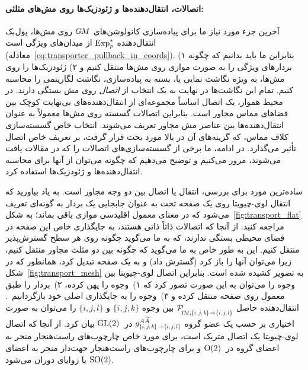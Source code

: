 \paragraph{اتصالات، انتقال‌دهنده‌ها و ژئودزیک‌ها روی مش‌های مثلثی:}
آخرین جزء مورد نیاز ما برای پیاده‌سازی کانولوشن‌های $G\mkern-1.4muM$ روی مش‌ها، پول‌بک انتقال‌دهنده $\operatorname{Exp}^*_p$ از میدان‌های ویژگی است (معادله~\eqref{eq:transporter_pullback_in_coords}).
بنابراین ما باید بدانیم که چگونه
۱) بردارهای ویژگی را به صورت موازی روی مش‌ها منتقل کنیم و
۲) ژئودزیک‌ها را روی مش‌ها، به ویژه نگاشت نمایی یا، بسته به پیاده‌سازی، نگاشت لگاریتمی را محاسبه کنیم.
تمام این نگاشت‌ها در نهایت به یک انتخاب از \emph{اتصال} روی مش بستگی دارند.
در محیط هموار، یک اتصال اساساً مجموعه‌ای از انتقال‌دهنده‌های بی‌نهایت کوچک بین فضاهای مماس مجاور است.
بنابراین اتصالات گسسته روی مش‌ها معمولاً به عنوان انتقال‌دهنده‌ها بین عناصر مش مجاور تعریف می‌شوند.
انتخاب خاص گسسته‌سازی کلاف مماس، که گزینه‌های آن در بالا مورد بحث قرار گرفت، بر تعریف خاص اتصال تأثیر می‌گذارد.
در ادامه، ما برخی از گسسته‌سازی‌های اتصالات را که در مقالات یافت می‌شوند، مرور می‌کنیم و توضیح می‌دهیم که چگونه می‌توان از آنها برای محاسبه انتقال‌دهنده‌ها و ژئودزیک‌ها استفاده کرد.


ساده‌ترین مورد برای بررسی، انتقال یا اتصال بین دو وجه مجاور است.
به یاد بیاورید که انتقال لوی-چیویتا روی یک صفحه تخت به عنوان جابجایی یک بردار به گونه‌ای تعریف می‌شود که در معنای معمول اقلیدسی موازی باقی بماند؛ به شکل~\ref{fig:transport_flat} مراجعه کنید.
از آنجا که اتصالات ذاتاً ذاتی هستند، به جایگذاری خاص این صفحه در فضای محیطی بستگی ندارند، که به ما می‌گوید چگونه روی هر سطح گسترش‌پذیر منتقل کنیم.
این به طور خاص به ما می‌گوید که چگونه بین دو مثلث مجاور منتقل کنیم، زیرا می‌توان آنها را باز کرد (گسترش داد) و به یک صفحه تبدیل کرد، همانطور که در شکل~\ref{fig:transport_mesh} به تصویر کشیده شده است.
بنابراین اتصال لوی-چیویتا بین وجوه را می‌توان به این صورت تصور کرد که
۱)~وجوه را پهن کرده،
۲)~بردار را طبق معمول روی صفحه منتقل کرده و
۳)~وجوه را به جایگذاری اصلی خود بازگردانیم~\cite{craneTrivialConnectionsDiscrete2010,mitchell1987discrete,craneDiscreteDifferentialGeometry2014}.
انتقال‌دهنده حاصل
$\mathcal{P}_{\mkern-2mu\overset{}{\protect\scalebox{.62}{$\!T\!M$},\protect\scalebox{.68}{$\{i,j,k\mkern-1mu\}\!\to\!\{i,j,l\}$}}}$
بین وجوه $\{i,j,k\}$ و $\{i,j,l\}$ را می‌توان به صورت اختیاری بر حسب یک عضو گروه
$g^{A\widetilde{A}}_{\protect\scalebox{.68}{$\{i,j,k\mkern-1mu\}\!\to\!\{i,j,l\}$}}$ در~$\operatorname{GL}(2)$ بیان کرد.
از آنجا که اتصال لوی-چیویتا یک اتصال متریک است، برای مورد خاص چارچوب‌های راست‌هنجار منجر به اعضای گروه در~$\operatorname{O}(2)$ و برای چارچوب‌های راست‌هنجار جهت‌دار منجر به اعضای $\operatorname{SO}(2)$ یا زوایای دوران می‌شود.

